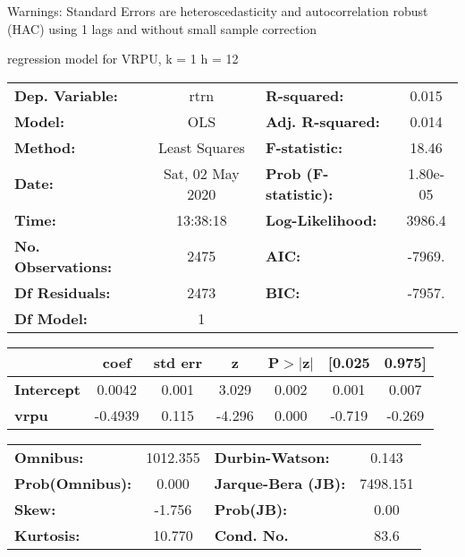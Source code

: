 Warnings: \newline
 [1] Standard Errors are heteroscedasticity and autocorrelation robust (HAC) using 1 lags and without small sample correction\ 

regression model for VRPU, k = 1 h = 12\begin{center}
\begin{tabular}{lclc}
\toprule
\textbf{Dep. Variable:}    &       rtrn       & \textbf{  R-squared:         } &     0.015   \\
\textbf{Model:}            &       OLS        & \textbf{  Adj. R-squared:    } &     0.014   \\
\textbf{Method:}           &  Least Squares   & \textbf{  F-statistic:       } &     18.46   \\
\textbf{Date:}             & Sat, 02 May 2020 & \textbf{  Prob (F-statistic):} &  1.80e-05   \\
\textbf{Time:}             &     13:38:18     & \textbf{  Log-Likelihood:    } &    3986.4   \\
\textbf{No. Observations:} &        2475      & \textbf{  AIC:               } &    -7969.   \\
\textbf{Df Residuals:}     &        2473      & \textbf{  BIC:               } &    -7957.   \\
\textbf{Df Model:}         &           1      & \textbf{                     } &             \\
\bottomrule
\end{tabular}
\begin{tabular}{lcccccc}
                   & \textbf{coef} & \textbf{std err} & \textbf{z} & \textbf{P$> |$z$|$} & \textbf{[0.025} & \textbf{0.975]}  \\
\midrule
\textbf{Intercept} &       0.0042  &        0.001     &     3.029  &         0.002        &        0.001    &        0.007     \\
\textbf{vrpu}      &      -0.4939  &        0.115     &    -4.296  &         0.000        &       -0.719    &       -0.269     \\
\bottomrule
\end{tabular}
\begin{tabular}{lclc}
\textbf{Omnibus:}       & 1012.355 & \textbf{  Durbin-Watson:     } &    0.143  \\
\textbf{Prob(Omnibus):} &   0.000  & \textbf{  Jarque-Bera (JB):  } & 7498.151  \\
\textbf{Skew:}          &  -1.756  & \textbf{  Prob(JB):          } &     0.00  \\
\textbf{Kurtosis:}      &  10.770  & \textbf{  Cond. No.          } &     83.6  \\
\bottomrule
\end{tabular}
\end{center}

